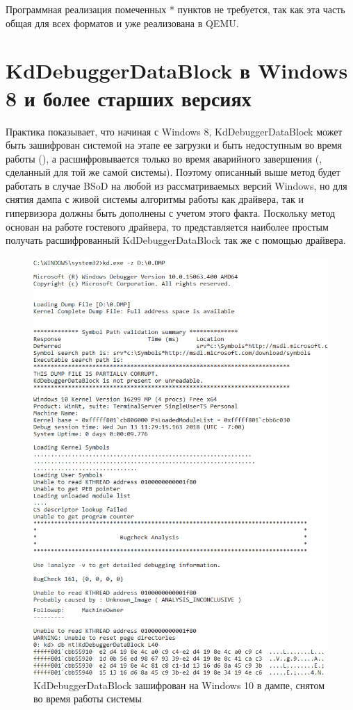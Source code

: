 \documentclass{mipt-thesis-bs}
\begin{document}
Программная реализация помеченных {*} пунктов не требуется, так как эта часть общая для всех форматов и уже реализована в QEMU.

\section*{KdDebuggerDataBlock в Windows 8 и более старших версиях}

Практика показывает, что начиная с Windows 8, KdDebuggerDataBlock может быть зашифрован системой на этапе ее загрузки и быть недоступным во время работы (), а расшифровывается только во время аварийного завершения (, сделанный для той же самой системы). Поэтому описанный выше метод будет работать в случае BSoD на любой из рассматриваемых версий Windows, но для снятия дампа с живой системы алгоритмы работы как драйвера, так и гипервизора должны быть дополнены с учетом этого факта. Поскольку метод основан на работе гостевого драйвера, то представляется наиболее простым получать расшифрованный KdDebuggerDataBlock так же с помощью драйвера.

\begin{figure}[h]
\begin{center}
    \captionsetup{justification=centering}
    \includegraphics[width=1\textwidth]{kd2.png}
    \caption{KdDebuggerDataBlock зашифрован на Windows 10 в дампе, снятом во время работы системы}
    \label{fig:kd1}
\end{center}
\end{figure}
\end{document}

